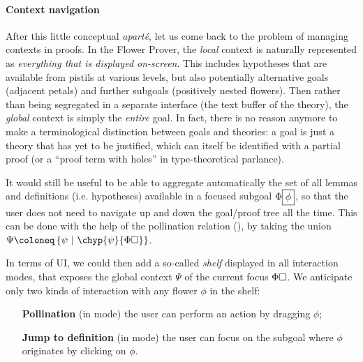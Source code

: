 \paragraph{Context navigation}

After this little conceptual \textit{aparté}, let us come back to the problem of
managing contexts in proofs. In the Flower Prover, the \emph{local} context is
naturally represented as \emph{everything that is displayed on-screen}. This
includes hypotheses that are available from pistils at various levels, but also
potentially alternative goals (adjacent petals) and further subgoals (positively
nested flowers). Then rather than being segregated in a separate interface (the
text buffer of the theory), the \emph{global} context is simply the
\emph{entire} goal. In fact, there is no reason anymore to make a terminological
distinction between goals and theories: a goal is just a theory that has yet to
be justified, which can itself be identified with a partial proof (or a ``proof
term with holes'' in type-theoretical parlance).

It would still be useful to be able to aggregate automatically the set of all
lemmas and definitions (i.e. hypotheses) available in a focused subgoal
$\Phi\fbox{$\phi$}$, so that the user does not need to navigate up and down the
goal/proof tree all the time. This can be done with the help of the pollination
relation (), by taking the union $\Psi \deq
\compr{\psi}{\chyp{\psi}{\Phi\hole}}$.

In terms of UI, we could then add a so-called \emph{shelf} displayed in all
interaction modes, that exposes the global context $\Psi$ of the current focus
$\Phi\square$. We anticipate only two kinds of interaction with any flower $\phi$
in the shelf:
\begin{itemize}
  \item[\textbf{Pollination} (in \Proof mode)] the user can perform an
   action by dragging $\phi$;
  \item[\textbf{Jump to definition} (in \Navigation mode)] the user can focus on
  the subgoal where $\phi$ originates by clicking on $\phi$.
\end{itemize}

